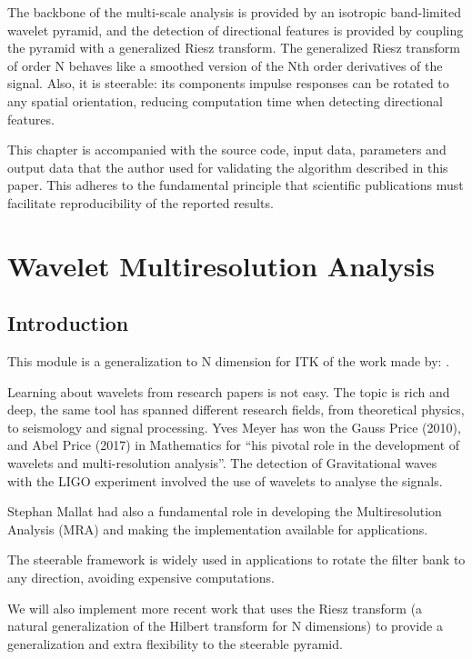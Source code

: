 The backbone of the multi-scale analysis is provided by an isotropic band-limited wavelet pyramid, and the detection of directional features is provided by coupling the pyramid with a generalized Riesz transform.
The generalized Riesz transform of order N behaves like a smoothed version of the Nth order derivatives of the signal. Also, it is steerable: its components impulse responses can be rotated to any spatial orientation, reducing computation time when detecting directional features.

This chapter is accompanied with the source code, input data, parameters and
output data that the author used for validating the algorithm described in
this paper. This adheres to the fundamental principle that scientific
publications must facilitate reproducibility of the reported results.

\section{Wavelet Multiresolution Analysis}
\label{sec:first}

\subsection{Introduction}
\label{sub:introduction}
This module is a generalization to N dimension for ITK of the work made by: \cite{freeman_design_1991, simoncelli_steerable_1995, kovesi_image_1999, held_steerable_2010,chenouard_3d_2012, unser_steerable_2011, pad_vow:_2014}.

Learning about wavelets from research papers is not easy. The topic is rich and deep, the same tool has spanned different research fields, from theoretical physics, to seismology and signal processing.
Yves Meyer has won the Gauss Price (2010), and Abel Price (2017) in Mathematics for ``his pivotal role in the development of wavelets and multi-resolution analysis''. The detection of Gravitational waves with the LIGO experiment involved the use of wavelets to analyse the signals.

Stephan Mallat \cite{mallat_theory_1989} had also a fundamental role in developing the Multiresolution Analysis (MRA) and making the implementation available for applications.

The steerable framework \cite{freeman_design_1991, simoncelli_steerable_1995} is widely used in applications to rotate the filter bank to any direction, avoiding expensive computations.

We will also implement more recent work \cite{held_steerable_2010, unser_steerable_2011, chenouard_3d_2012} that uses the Riesz transform (a natural generalization of the Hilbert transform for N dimensions) to provide a generalization and extra flexibility to the steerable pyramid.

